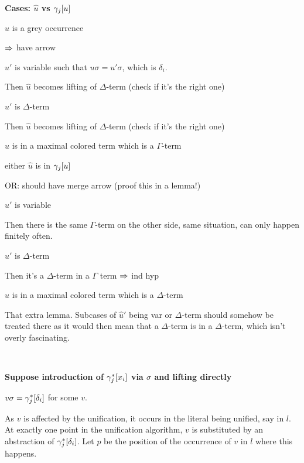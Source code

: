 \documentclass[,%
	paper=a4,%
	DIV14, %
	twoside=false,%
	liststotoc,
	bibtotoc,
	draft=false,%
	numbers=noendperiod
]{scrartcl}
\begin{document}
\textbf{Cases: $\hat u$ vs $\gamma_j[u]$}
\begin{compactitem}
\item $\hat u$ is a grey occurrence 

	$\Rightarrow$ have arrow

	\begin{compactitem}
	\item $\hat u'$ is variable such that $u\sigma = u'\sigma$, which is $\delta_i$.

		Then $\hat u$ becomes lifting of $\Delta$-term (check if it's the right one)
	\item $\hat u'$ is $\Delta$-term

		Then $\hat u$ becomes lifting of $\Delta$-term (check if it's the right one)
	\end{compactitem}

\item $\hat u$ is in a maximal colored term which is a $\Gamma$-term

	either $\hat u$ is in $\gamma_j[u]$ \checkmark

	OR: should have merge arrow (proof this in a lemma!)

	\begin{compactitem}
	\item $\hat u'$ is variable 

		Then there is the same $\Gamma$-term on the other side, same situation, can only happen finitely often.

	\item $\hat u'$ is $\Delta$-term

		Then it's a $\Delta$-term in a $\Gamma$ term $\Rightarrow$ ind hyp
	\end{compactitem}
\item $\hat u$ is in a maximal colored term which is a $\Delta$-term

	That extra lemma. Subcases of $\hat u'$ being var or $\Delta$-term should somehow be treated there as it would then mean that a $\Delta$-term is in a $\Delta$-term, which isn't overly fascinating.
\end{compactitem}


~

{\bfseries Suppose introduction of $\gamma_j^*[x_i]$ via $\sigma$ and lifting directly}

$v\sigma = \gamma_j^*[\delta_i]$ for some $v$.

As $v$ is affected by the unification, it occurs in the literal being unified, say in $l$.
At exactly one point in the unification algorithm, $v$ is substituted by an abstraction of $\gamma_j^*[\delta_i]$.
Let $p$ be the position of the occurrence of $v$ in $l$ where this happens.
\end{document}
